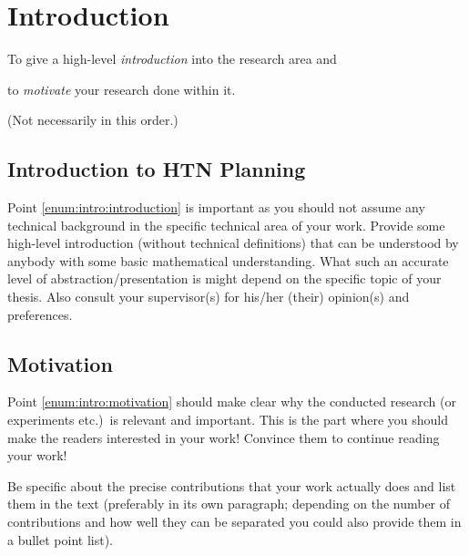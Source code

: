 \chapter{Introduction}
 
\begin{compactenum}
  \item To give a high-level \emph{introduction} into the research area and\label{enum:intro:introduction}
  \item to \emph{motivate} your research done within it.\label{enum:intro:motivation}
\end{compactenum}
(Not necessarily in this order.)

\section{Introduction to HTN Planning}

Point \ref{enum:intro:introduction} is important as you should not assume any technical background in the specific technical area of your work. Provide some high-level introduction (without technical definitions) that can be understood by anybody with some basic mathematical understanding. What such an accurate level of abstraction/presentation is might depend on the specific topic of your thesis. Also consult your supervisor(s) for his/her (their) opinion(s) and preferences. 
 

\section{Motivation}
Point \ref{enum:intro:motivation} should make clear why the conducted research (or experiments etc.)\ is relevant and important. This is the part where you should make the readers interested in your work! Convince them to continue reading your work!

Be specific about the precise contributions that your work actually does and list them in the text (preferably in its own paragraph; depending on the number of contributions and how well they can be separated you could also provide them in a bullet point list).

